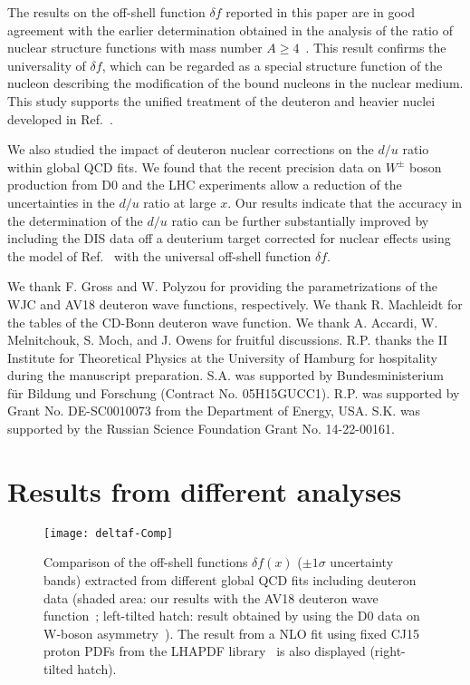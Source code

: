 \documentclass[%
      aps,
      prd,
      floatfix,
      preprintnumbers,
      preprint,
      showpacs,
      nofootinbib,
      tightenlines,
      amssymb,
      amsmath
]{revtex4-1}
\begin{document}
The results on the off-shell function $\delta f$ reported in this paper are in good agreement 
with the earlier determination obtained in the analysis of the ratio of nuclear structure functions 
with mass number $A\geq4$~\cite{KP04}. This result confirms the universality of $\delta f$, 
which can be regarded as a special structure function 
of the nucleon describing the modification of the bound nucleons in the nuclear medium. 
This study supports the unified treatment of the deuteron and heavier nuclei 
developed in Ref.~\cite{KP04}. 

We also studied the impact of deuteron nuclear corrections on the $d/u$ ratio within global QCD fits. 
We found that the recent precision data on $W^\pm$ boson production from D0 and the LHC experiments 
allow a reduction of the uncertainties in the $d/u$ ratio at large $x$.
Our results indicate that the accuracy in the determination of the $d/u$ ratio can be further 
substantially improved by including the DIS data off a deuterium target corrected for nuclear effects 
using the model of Ref.~\cite{KP04} with the universal off-shell function $\delta f$. 



\begin{acknowledgments}

We thank F. Gross and W. Polyzou for providing the parametrizations of the WJC and AV18 deuteron 
wave functions, respectively. 
We thank R. Machleidt for the tables of the CD-Bonn deuteron wave function. 
We thank A. Accardi, W. Melnitchouk, S. Moch, and J. Owens for fruitful discussions.   
R.P. thanks the II Institute for Theoretical Physics at the University of Hamburg for 
hospitality during the manuscript preparation. 
S.A. was supported by Bundesministerium f\"ur Bildung und Forschung (Contract No. 05H15GUCC1). 
R.P. was supported by Grant No. DE-SC0010073 from the Department of Energy, USA.
S.K. was supported by the Russian Science Foundation Grant No. 14-22-00161.

\end{acknowledgments} 


\newpage 
\appendix* 
\section{Results from different analyses} 


\begin{figure}[htb] %
\begin{center}
\texttt{[image: deltaf-Comp]}
\caption{%
Comparison of the off-shell functions $\delta f(x)$ ($\pm 1 \sigma$ uncertainty bands)
extracted from different global QCD fits including deuteron data  
(shaded area: our results with the AV18 deuteron wave function~\cite{Veerasamy:2011ak}; 
left-tilted hatch: result obtained by using the D0 data on W-boson asymmetry~\cite{Abazov:2013dsa}). 
The result from a NLO fit using fixed CJ15 proton PDFs from 
the LHAPDF library~\cite{Buckley:2014ana} is also displayed (right-tilted hatch). 
}
\label{fig:CJ15deltaf}
\end{center}
\end{figure}
\end{document}
